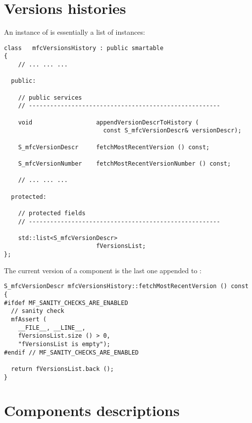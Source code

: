 \section{Versions histories}\label{Versions histories}

An instance of  is essentially a list of  instances:
\begin{lstlisting}[language=CPlusPlus]
class   mfcVersionsHistory : public smartable
{
	// ... ... ...

  public:

    // public services
    // ------------------------------------------------------

    void                  appendVersionDescrToHistory (
                            const S_mfcVersionDescr& versionDescr);

    S_mfcVersionDescr     fetchMostRecentVersion () const;

    S_mfcVersionNumber    fetchMostRecentVersionNumber () const;

	// ... ... ...

  protected:

    // protected fields
    // ------------------------------------------------------

    std::list<S_mfcVersionDescr>
                          fVersionsList;
};
\end{lstlisting}

The current version of a component is the last one appended to :
\begin{lstlisting}[language=CPlusPlus]
S_mfcVersionDescr mfcVersionsHistory::fetchMostRecentVersion () const
{
#ifdef MF_SANITY_CHECKS_ARE_ENABLED
  // sanity check
  mfAssert (
    __FILE__, __LINE__,
    fVersionsList.size () > 0,
    "fVersionsList is empty");
#endif // MF_SANITY_CHECKS_ARE_ENABLED

  return fVersionsList.back ();
}
\end{lstlisting}


\section{Components descriptions}\label{Components descriptions}

